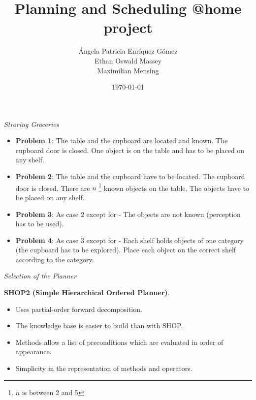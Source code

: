 \documentclass{beamer}
\title{Planning and Scheduling  @home project}
\date{\today}
\author{\'{A}ngela Patricia Enr\'{i}quez G\'{o}mez \\ Ethan Oswald Massey \\ Maximilian Mensing}
\institute{BRSU}
\begin{document}
	\maketitle
	
	\begin{frame}{\textsl{Stroring Groceries}}
		
		\begin{itemize}
			\item \textbf{Problem 1}: The table and the cupboard are located and known. The cupboard door is closed. One object is on the table and has to be placed on any shelf. 
			\item \textbf{Problem 2}: The table and the cupboard have to be located. The cupboard door is closed. There are $n$ \footnote{$n$ is between 2 and 5} known objects on the table. The objects have to be placed on any shelf.
			\item \textbf{Problem 3}: As case 2 except for - The objects are not known (perception has to be used).
			
			\item \textbf{Problem 4}: As case 3 except for - Each shelf holds objects of one category (the cupboard has to be explored). Place each object on the correct shelf according to the category.
			
		\end{itemize}
		
	\end{frame}
	
	\begin{frame}{\textsl{Selection of the Planner}}
		
		\textbf{SHOP2 (Simple Hierarchical Ordered Planner)}.
		
		\begin{itemize}
			\item Uses partial-order forward decomposition. 
			\item The knowledge base is easier to build than with SHOP.
			\item Methods allow a list of preconditions which are evaluated in order of appearance.
			\item Simplicity in the representation of methods and operators.
		\end{itemize} 
		
	\end{frame}	
	
\end{document}
